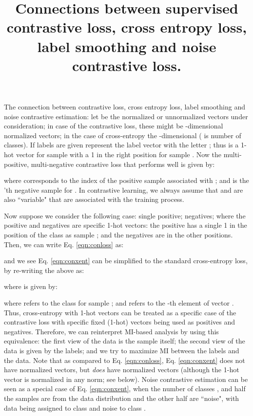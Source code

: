 \documentclass[10pt,letterpaper]{article}
\begin{document}
\title{Connections between supervised contrastive loss, cross entropy loss, label smoothing and noise contrastive loss.}

\maketitle

The connection between contrastive loss, cross entropy loss, label smoothing and noise contrastive estimation: let  be the normalized or unnormalized vectors under consideration; in case of the contrastive loss, these might be -dimensional normalized vectors; in the case of cross-entropy the -dimensional ( is number of classes). If labels are given represent the label vector with the letter ; thus  is a 1-hot vector for sample  with a 1 in the right position for sample . Now the multi-positive, multi-negative contrastive loss that performs well is given by:



where  corresponds to the index of the positive sample associated with ; and  is the 'th negative sample for . In contrastive learning, we always assume that  and  are also ``variable" that are associated with the training process. 

Now suppose we consider the following case: single positive;  negatives; where the positive and negatives are specific 1-hot vectors: the positive has a single 1 in the position of the class as sample ; and the negatives are in the other  positions. Then, we can write Eq. \ref{eqn:conloss} as:



and we see Eq. \ref{eqn:conxent} can be simplified to the standard cross-entropy loss, by re-writing the above as:



where  is given by:



where  refers to the class for sample ; and  refers to the -th element of vector . Thus, cross-entropy with 1-hot vectors can be treated as a specific case of the contrastive loss with specific fixed (1-hot) vectors being used as positives and negatives. Therefore, we can reinterpret MI-based analysis by using this equivalence: the first view of the data is the sample itself; the second view of the data is given by the labels; and we try to maximize MI between the labels and the data. Note that as compared to Eq. \ref{eqn:conloss}, Eq. \ref{eqn:conxent} does not have  normalized  vectors, but \emph{does} have normalized  vectors (although the 1-hot vector is normalized in any  norm; see below). Noise contrastive estimation can be seen as a special case of Eq. \ref{eqn:conxent}, when the number of classes , and half the samples are from the data distribution and the other half are ``noise", with data being assigned to class  and noise to class .
\end{document}

